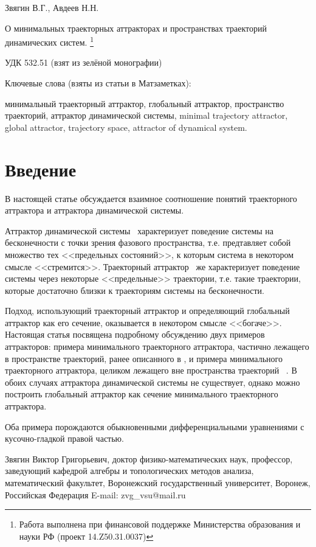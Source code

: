 \documentclass[a4paper]{article} %
\begin{document}
Звягин В.Г., Авдеев Н.Н.


О минимальных траекторных аттракторах и пространствах траекторий динамических систем.
\footnote{
	Работа выполнена при финансовой поддержке Министерства образования и науки РФ
	(проект 14.Z50.31.0037)
}

УДК 532.51 (взят из зелёной монографии)

Ключевые слова (взяты из статьи в Матзаметках):

минимальный траекторный аттрактор, глобальный аттрактор, пространство траекторий, аттрактор динамической системы,
minimal trajectory attractor, global attractor, trajectory space, attractor of dynamical system.



\section{Введение}
В настоящей статье обсуждается взаимное соотношение понятий траекторного аттрактора и аттрактора динамической системы.

Аттрактор динамической системы~\cite{Vishik}
характеризует поведение системы на бесконечности с точки зрения фазового пространства,
т.е. предтавляет собой множество тех <<предельных состояний>>, к которым система в некотором смысле <<стремится>>.
Траекторный аттрактор~\cite{Vorotnikov,Kondratyev} же характеризует поведение системы
через некоторые <<предельные>> траектории, т.е. такие траектории,
которые достаточно близки к траекториям системы на бесконечности.

Подход, использующий траекторный аттрактор и определяющий глобальный аттрактор как его сечение,
оказывается в некотором смысле <<богаче>>.
Настоящая статья посвящена подробному обсуждению двух примеров аттракторов:
примера минимального траекторного аттрактора,
частично лежащего в пространстве траекторий, ранее описанного в \cite{Zelenaya},
и примера минимального траекторного аттрактора, целиком лежащего вне пространства траекторий
~\cite{mzmZvAv,vvmshZvAv}.
В обоих случаях аттрактора динамической системы не существует,
однако можно построить глобальный аттрактор как сечение минимального траекторного аттрактора.

Оба примера порождаются обыкновенными дифференциальными уравнениями с кусочно-гладкой правой частью.





Звягин Виктор Григорьевич, доктор
физико-математических наук, профессор,
заведующий кафедрой алгебры и топологических методов
анализа, математический факультет, Воронежский государственный университет,
Воронеж, Российская Федерация
E-mail: zvg\_vsu@mail.ru
\end{document}
